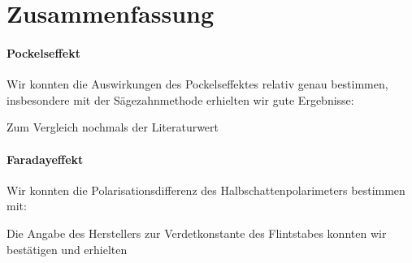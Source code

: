 \section{Zusammenfassung}

\paragraph{Pockelseffekt} Wir konnten die Auswirkungen des Pockelseffektes relativ genau bestimmen, insbesondere mit der Sägezahnmethode erhielten wir gute Ergebnisse:

\begin{center}
\end{center}

Zum Vergleich nochmals der Literaturwert

\begin{center}
\end{center}

\paragraph{Faradayeffekt} Wir konnten die Polarisationsdifferenz des Halbschattenpolarimeters bestimmen mit:

\begin{center}
\end{center}

Die Angabe des Herstellers zur Verdetkonstante des Flintstabes konnten wir bestätigen und erhielten

\begin{center}
\end{center}
